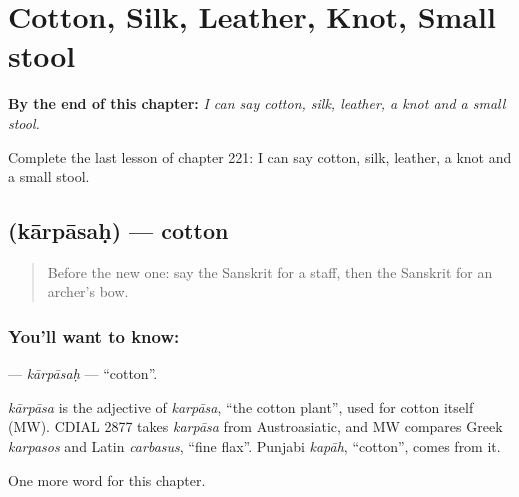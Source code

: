 
\chapter{Cotton, Silk, Leather, Knot, Small stool}
\label{ch:sa-cotton-silk-leather-knot-small-stool}

\begin{chapteropening}
\textbf{By the end of this chapter:} \emph{I can say cotton, silk, leather, a knot and a small stool.}

Complete the last lesson of chapter 221: I can say cotton, silk, leather, a knot and a small stool.
\end{chapteropening}

\section[\texorpdfstring{\sk{कार्पासः} (kārpāsaḥ)}{कार्पासः (kārpāsaḥ)}]{ (kārpāsaḥ) — cotton}

\label{lesson:SA-C221-karpasah}



\begin{quote}
Before the new one: say the Sanskrit for a staff, then the Sanskrit for an archer's bow.
\end{quote}

\subsection*{You'll want to know: }
\textbf{} — \emph{kārpāsaḥ} — \textquotedblleft{}cotton\textquotedblright{}.

\begin{cousinweb}
\emph{kārpāsa} is the adjective of \emph{karpāsa}, \textquotedblleft{}the cotton plant\textquotedblright{}, used for cotton itself (MW). CDIAL 2877 takes \emph{karpāsa} from Austroasiatic, and MW compares Greek \emph{karpasos} and Latin \emph{carbasus}, \textquotedblleft{}fine flax\textquotedblright{}. Punjabi \emph{kapāh}, \textquotedblleft{}cotton\textquotedblright{}, comes from it.
\end{cousinweb}

\begin{grammarlens}[title={What you've built}]
One more word for this chapter.
\end{grammarlens}

